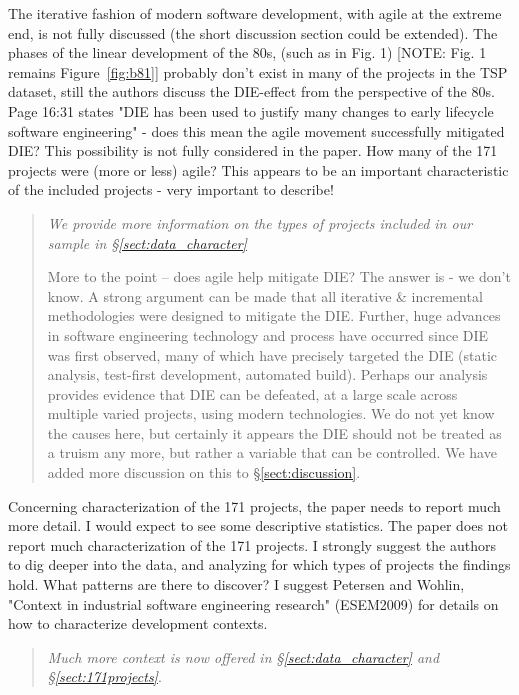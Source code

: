 \documentclass[smallcondensed]{svjour3}
\newcommand{\tion}[1]{\S\ref{sect:#1}}
\newcommand{\fig}[1]{Figure~\ref{fig:#1}}
\begin{document}
The iterative fashion of modern software development,
with agile at the extreme end, is not fully discussed (the
short discussion section could be extended). The phases of
the linear development of the 80s, (such as in Fig. 1) [NOTE: Fig. 1 remains \fig{b81}] 
probably don't exist in many of the projects in the TSP
dataset, still the authors discuss the DIE-effect from the
perspective of the 80s. Page 16:31 states "DIE has been used
to justify many changes to early lifecycle software
engineering" - does this mean the agile movement
successfully mitigated DIE? This possibility is not fully
considered in the paper.
How many of the 171 projects were
(more or less) agile? This appears to be an important
characteristic of the included projects - very important to
describe! 

\begin{quote}{\em We provide more information on the types of projects included in our sample in \tion{data_character}

More to the point -- does agile help mitigate DIE? The answer is - we don't know. A strong argument can be made that all iterative \& incremental methodologies were designed to mitigate the DIE. Further, huge advances in software engineering technology and process have occurred since DIE was first observed, many of which have precisely targeted the DIE (static analysis, test-first development, automated build). Perhaps our analysis provides evidence that DIE can be defeated, at a large scale across multiple varied projects, using modern technologies. We do not yet know the causes here, but certainly it appears the DIE should not be treated as a truism any more, but rather a variable that can be controlled. We have added more discussion on this to \tion{discussion}.
}\end{quote}


Concerning characterization of the 171 projects, the
paper needs to report much more detail. I would expect to
see some descriptive statistics.   The paper does not report much
characterization of the 171 projects. I strongly suggest the
authors to dig deeper into the data, and analyzing for which
types of projects the findings hold. What patterns are there
to discover? I suggest Petersen and Wohlin, "Context in
industrial software engineering research" (ESEM2009) for
details on how to characterize development contexts.

\begin{quote}{\em Much more context is now offered in \tion{data_character} and \tion{171projects}}. \end{quote}
\end{document}
